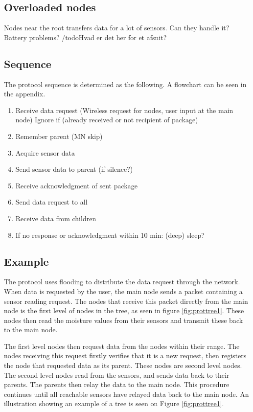 \subsection{Overloaded nodes}
Nodes near the root transfers data for a lot of sensors. Can they handle it? Battery problems? /todo{Hvad er det her for et afsnit?}

\subsection{Sequence}
The protocol sequence is determined as the following. A flowchart can be seen in the appendix.
\begin{enumerate}
	\item Receive data request (Wireless request for nodes, user input at the main node)
		\subitem Ignore if (already received or not recipient of package)
	\item Remember parent (MN skip)
	\item Acquire sensor data
	\item Send sensor data to parent (if silence?)
	\item Receive acknowledgment of sent package
	\item Send data request to all
	\item Receive data from children
	\item If no response or acknowledgment within 10 min: (deep) sleep?
\end{enumerate}

\subsection*{Example}
The protocol uses flooding to distribute the data request through the network. 
When data is requested by the user, the main node sends a packet containing a sensor reading request. 
The nodes that receive this packet directly from the main node is the first level of nodes in the tree, as seen in figure \ref{fig:prottree1}. 
These nodes then read the moisture values from their sensors and transmit these back to the main node. 

The first level nodes then request data from the nodes within their range. 
The nodes receiving this request firstly verifies that it is a new request, then registers the node that requested data as its parent. 
These nodes are second level nodes. The second level nodes read from the sensors, and sends data back to their parents. The parents then relay the data to the main node. 
This procedure continues until all reachable sensors have relayed data back to the main node.
An illustration showing an example of a tree is seen on Figure \ref{fig:prottree1}.

